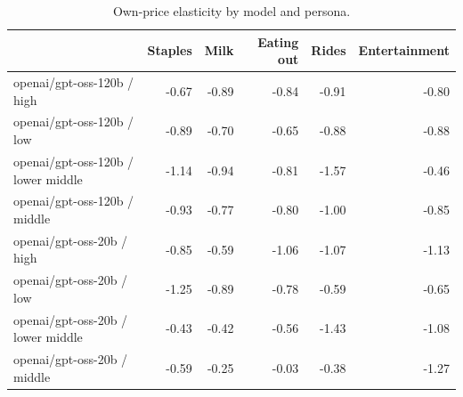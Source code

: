 \begin{table}[!htbp]\centering\small
\caption{Own-price elasticity by model and persona.}\label{tab:own_price_by_persona}
\begin{tabular}{lrrrrr}
\hline
 & Staples & Milk & Eating out & Rides & Entertainment \\ \hline
openai/gpt-oss-120b / high & -0.67 & -0.89 & -0.84 & -0.91 & -0.80 \\
openai/gpt-oss-120b / low & -0.89 & -0.70 & -0.65 & -0.88 & -0.88 \\
openai/gpt-oss-120b / lower middle & -1.14 & -0.94 & -0.81 & -1.57 & -0.46 \\
openai/gpt-oss-120b / middle & -0.93 & -0.77 & -0.80 & -1.00 & -0.85 \\
openai/gpt-oss-20b / high & -0.85 & -0.59 & -1.06 & -1.07 & -1.13 \\
openai/gpt-oss-20b / low & -1.25 & -0.89 & -0.78 & -0.59 & -0.65 \\
openai/gpt-oss-20b / lower middle & -0.43 & -0.42 & -0.56 & -1.43 & -1.08 \\
openai/gpt-oss-20b / middle & -0.59 & -0.25 & -0.03 & -0.38 & -1.27 \\
\hline
\end{tabular}
\end{table}